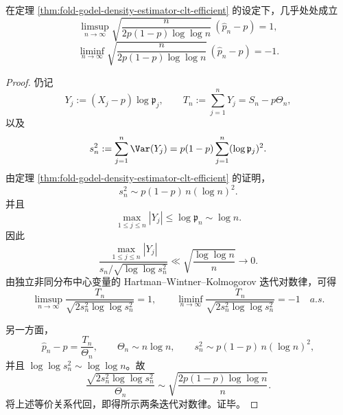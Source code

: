 \begin{theorem}\label{thm:fold-godel-density-estimator-lil}
在定理 \ref{thm:fold-godel-density-estimator-clt-efficient} 的设定下，几乎处处成立
\[
\limsup_{n\to\infty}
\sqrt{\frac{n}{2p(1-p)\log\log n}}\,
(\widehat p_n-p)=1,
\]
\[
\liminf_{n\to\infty}
\sqrt{\frac{n}{2p(1-p)\log\log n}}\,
(\widehat p_n-p)=-1.
\]
\end{theorem}
\begin{proof}
仍记
\[
Y_j:=(X_j-p)\log \mathfrak p_j,
\qquad
T_n:=\sum_{j=1}^{n}Y_j=S_n-p\Theta_n,
\]
以及
\[
s_n^2:=\sum_{j=1}^{n}\Var(Y_j)
=
p(1-p)\sum_{j=1}^{n}(\log \mathfrak p_j)^2.
\]
由定理 \ref{thm:fold-godel-density-estimator-clt-efficient} 的证明，
\[
s_n^2\sim p(1-p)\,n(\log n)^2.
\]
并且
\[
\max_{1\le j\le n}|Y_j|
\le
\log \mathfrak p_n
\sim
\log n.
\]
因此
\[
\frac{\max_{1\le j\le n}|Y_j|}
{s_n/\sqrt{\log\log s_n^2}}
\ll
\sqrt{\frac{\log\log n}{n}}
\to 0.
\]
由独立非同分布中心变量的 Hartman--Wintner--Kolmogorov 迭代对数律，可得
\[
\limsup_{n\to\infty}
\frac{T_n}{\sqrt{2s_n^2\log\log s_n^2}}=1,
\qquad
\liminf_{n\to\infty}
\frac{T_n}{\sqrt{2s_n^2\log\log s_n^2}}=-1
\quad a.s.
\]

另一方面，
\[
\widehat p_n-p=\frac{T_n}{\Theta_n},
\qquad
\Theta_n\sim n\log n,
\qquad
s_n^2\sim p(1-p)\,n(\log n)^2,
\]
并且 \(\log\log s_n^2\sim \log\log n\)。故
\[
\frac{\sqrt{2s_n^2\log\log s_n^2}}{\Theta_n}
\sim
\sqrt{\frac{2p(1-p)\log\log n}{n}}.
\]
将上述等价关系代回，即得所示两条迭代对数律。证毕。
\end{proof}

\endinput
